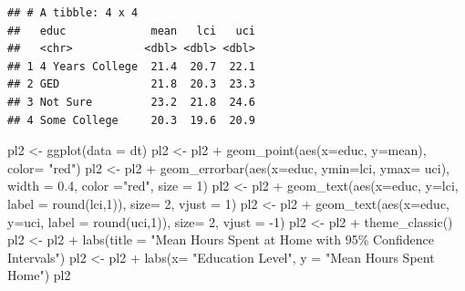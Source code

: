 \documentclass[
  11 pt,
]{article}
\newenvironment{Shaded}{\begin{snugshade}}{\end{snugshade}}
\newcommand{\AttributeTok}[1]{\textcolor[rgb]{0.77,0.63,0.00}{#1}}
\newcommand{\DecValTok}[1]{\textcolor[rgb]{0.00,0.00,0.81}{#1}}
\newcommand{\FloatTok}[1]{\textcolor[rgb]{0.00,0.00,0.81}{#1}}
\newcommand{\FunctionTok}[1]{\textcolor[rgb]{0.00,0.00,0.00}{#1}}
\newcommand{\NormalTok}[1]{#1}
\newcommand{\OtherTok}[1]{\textcolor[rgb]{0.56,0.35,0.01}{#1}}
\newcommand{\SpecialCharTok}[1]{\textcolor[rgb]{0.00,0.00,0.00}{#1}}
\newcommand{\StringTok}[1]{\textcolor[rgb]{0.31,0.60,0.02}{#1}}
\begin{document}
\begin{verbatim}
## # A tibble: 4 x 4
##   educ             mean   lci   uci
##   <chr>           <dbl> <dbl> <dbl>
## 1 4 Years College  21.4  20.7  22.1
## 2 GED              21.8  20.3  23.3
## 3 Not Sure         23.2  21.8  24.6
## 4 Some College     20.3  19.6  20.9
\end{verbatim}

\begin{Shaded}
\begin{Highlighting}[]
\NormalTok{pl2 }\OtherTok{\textless{}{-}} \FunctionTok{ggplot}\NormalTok{(}\AttributeTok{data =}\NormalTok{ dt)}
\NormalTok{pl2 }\OtherTok{\textless{}{-}}\NormalTok{ pl2 }\SpecialCharTok{+} \FunctionTok{geom\_point}\NormalTok{(}\FunctionTok{aes}\NormalTok{(}\AttributeTok{x=}\NormalTok{educ, }\AttributeTok{y=}\NormalTok{mean), }\AttributeTok{color=} \StringTok{"red"}\NormalTok{)}
\NormalTok{pl2 }\OtherTok{\textless{}{-}}\NormalTok{ pl2 }\SpecialCharTok{+} \FunctionTok{geom\_errorbar}\NormalTok{(}\FunctionTok{aes}\NormalTok{(}\AttributeTok{x=}\NormalTok{educ, }\AttributeTok{ymin=}\NormalTok{lci, }\AttributeTok{ymax=}\NormalTok{ uci), }\AttributeTok{width =} \FloatTok{0.4}\NormalTok{, }\AttributeTok{color =}\StringTok{"red"}\NormalTok{, }\AttributeTok{size =} \DecValTok{1}\NormalTok{)}
\NormalTok{pl2 }\OtherTok{\textless{}{-}}\NormalTok{ pl2 }\SpecialCharTok{+} \FunctionTok{geom\_text}\NormalTok{(}\FunctionTok{aes}\NormalTok{(}\AttributeTok{x=}\NormalTok{educ, }\AttributeTok{y=}\NormalTok{lci, }\AttributeTok{label =} \FunctionTok{round}\NormalTok{(lci,}\DecValTok{1}\NormalTok{)), }\AttributeTok{size=} \DecValTok{2}\NormalTok{, }\AttributeTok{vjust =} \DecValTok{1}\NormalTok{)}
\NormalTok{pl2 }\OtherTok{\textless{}{-}}\NormalTok{ pl2 }\SpecialCharTok{+} \FunctionTok{geom\_text}\NormalTok{(}\FunctionTok{aes}\NormalTok{(}\AttributeTok{x=}\NormalTok{educ, }\AttributeTok{y=}\NormalTok{uci, }\AttributeTok{label =} \FunctionTok{round}\NormalTok{(uci,}\DecValTok{1}\NormalTok{)), }\AttributeTok{size=} \DecValTok{2}\NormalTok{, }\AttributeTok{vjust =} \SpecialCharTok{{-}}\DecValTok{1}\NormalTok{)}
\NormalTok{pl2 }\OtherTok{\textless{}{-}}\NormalTok{ pl2 }\SpecialCharTok{+} \FunctionTok{theme\_classic}\NormalTok{()}
\NormalTok{pl2 }\OtherTok{\textless{}{-}}\NormalTok{ pl2 }\SpecialCharTok{+} \FunctionTok{labs}\NormalTok{(}\AttributeTok{title =} \StringTok{"Mean Hours Spent at Home with 95\% Confidence Intervals"}\NormalTok{)}
\NormalTok{pl2 }\OtherTok{\textless{}{-}}\NormalTok{ pl2 }\SpecialCharTok{+} \FunctionTok{labs}\NormalTok{(}\AttributeTok{x=} \StringTok{"Education Level"}\NormalTok{, }\AttributeTok{y =} \StringTok{"Mean Hours Spent Home"}\NormalTok{)}
\NormalTok{pl2}
\end{Highlighting}
\end{Shaded}
\end{document}
